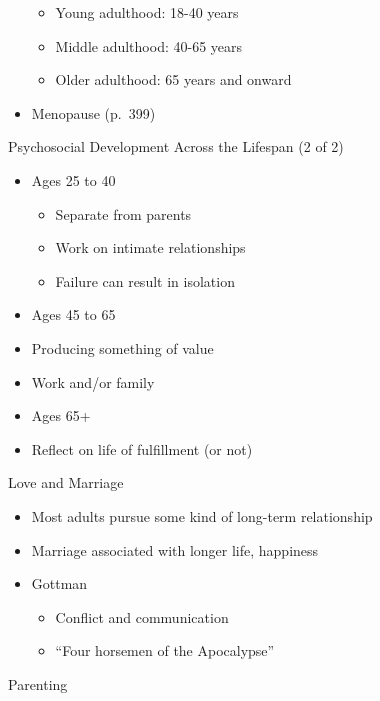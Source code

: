 \documentclass[
]{book}
\providecommand{\tightlist}{%
  \setlength{\itemsep}{0pt}\setlength{\parskip}{0pt}}
\begin{document}
\begin{reflect}
\begin{itemize}
  \begin{itemize}
  \tightlist
  \item
    Young adulthood: 18-40 years\\
  \item
    Middle adulthood: 40-65 years\\
  \item
    Older adulthood: 65 years and onward\\
  \end{itemize}
\item
  Menopause (p.~399)
\end{itemize}

Psychosocial Development Across the Lifespan (2 of 2)

\begin{itemize}
\tightlist
\item
  Ages 25 to 40

  \begin{itemize}
  \tightlist
  \item
    Separate from parents
  \item
    Work on intimate relationships
  \item
    Failure can result in isolation
  \end{itemize}
\item
  Ages 45 to 65
\item
  Producing something of value
\item
  Work and/or family
\item
  Ages 65+
\item
  Reflect on life of fulfillment (or not)
\end{itemize}

Love and Marriage

\begin{itemize}
\tightlist
\item
  Most adults pursue some kind of long-term relationship
\item
  Marriage associated with longer life, happiness
\item
  Gottman

  \begin{itemize}
  \tightlist
  \item
    Conflict and communication
  \item
    ``Four horsemen of the Apocalypse''
  \end{itemize}
\end{itemize}

Parenting


\end{reflect}
\end{document}
